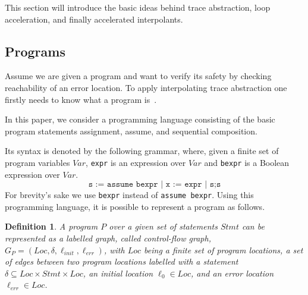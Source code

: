 \documentclass{article}
\newtheorem{mydef}{Definition}
\newcommand\mycom[1]{}
\newcommand\mycom[1]{#1}
\newcommand{\dd}[1]{\mycom{\todo[color=orange!40,inline]{\small DD: #1}}}
\begin{document}
This section will introduce the basic ideas behind trace abstraction, loop acceleration, and finally accelerated interpolants.

\subsection{Programs}
Assume we are given a program and want to verify its safety by checking reachability of an error location. 
To apply interpolating trace abstraction one firstly needs to know what a program is~\cite{DBLP:journals/corr/GreitschusDP17}.

In this paper, we consider a programming language consisting of the basic program statements assignment, assume, and sequential composition.
\dd{What about havoc?}
Its syntax is denoted by the following grammar, where, given a finite set of program variables $Var$, \texttt{expr} is an expression over $Var$ and \texttt{bexpr} is a Boolean expression over $Var$.
\begin{equation*}
    \texttt{s := assume bexpr | x := expr | s;s}
\end{equation*}
For brevity's sake we use \texttt{bexpr} instead of \texttt{assume bexpr}.
Using this programming language, it is possible to represent a program as follows.
\begin{mydef}
    A program $P$ over a given set of statements $Stmt$ can be represented as a labelled graph, called control-flow graph, 
    $G_P = (Loc, \delta, \ell_{init}, \ell_{err})$, with 
    $Loc$ being a finite set of program locations, 
    a set of edges between two program locations labelled with a statement $\delta \subseteq Loc \times Stmt \times Loc$, 
    an initial location $\ell_0 \in Loc$, and 
    an error location $\ell_{err} \in Loc$.
\end{mydef}
\end{document}
